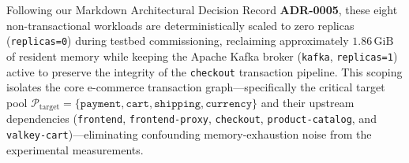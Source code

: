 Following our Markdown Architectural Decision Record \textbf{ADR-0005}, these eight non-transactional workloads are deterministically scaled to zero replicas (\texttt{replicas=0}) during testbed commissioning, reclaiming approximately $1.86\,\text{GiB}$ of resident memory while keeping the Apache Kafka broker (\texttt{kafka}, \texttt{replicas=1}) active to preserve the integrity of the \texttt{checkout} transaction pipeline. This scoping isolates the core e-commerce transaction graph---specifically the critical target pool $\mathcal{P}_{\text{target}} = \{\texttt{payment}, \texttt{cart}, \texttt{shipping}, \texttt{currency}\}$ and their upstream dependencies (\texttt{frontend}, \texttt{frontend-proxy}, \texttt{checkout}, \texttt{product-catalog}, and \texttt{valkey-cart})---eliminating confounding memory-exhaustion noise from the experimental measurements.
